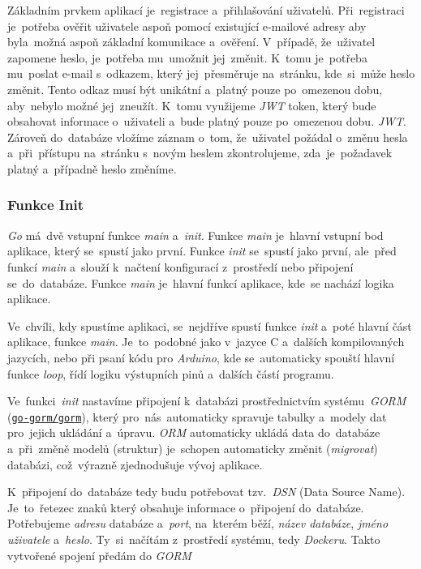 \documentclass[10pt,a4paper]{article}
\begin{document}
            Základním prvkem aplikací je~registrace a~přihlašování uživatelů. Při~registraci je~potřeba ověřit uživatele aspoň pomocí existující e-mailové adresy aby byla~možná aspoň základní komunikace a~ověření. V~případě, že~uživatel zapomene heslo, je~potřeba mu~umožnit jej~změnit. K~tomu je~potřeba mu~poslat e-mail s~odkazem, který jej~přesměruje na~stránku, kde~si~může heslo změnit. Tento odkaz musí být unikátní a~platný pouze po~omezenou dobu, aby~nebylo možné jej~zneužít. K~tomu využijeme \emph{JWT} token, který bude obsahovat informace o~uživateli a~bude platný pouze po~omezenou dobu. \emph{JWT}. Zároveň do~databáze vložíme záznam o~tom, že~uživatel požádal o~změnu hesla a~při~přístupu na~stránku s~novým heslem zkontrolujeme, zda~je~požadavek platný a~případně heslo změníme.
            
            \subsubsection{Funkce Init}
            \emph{Go} má~dvě vstupní funkce \emph{main} a~\emph{init}. Funkce \emph{main} je~hlavní vstupní bod aplikace, který se~spustí jako první. Funkce \emph{init} se~spustí jako první, ale~před funkcí \emph{main} a~slouží k~načtení konfigurací z~prostředí nebo připojení se~do~databáze. Funkce \emph{main} je~hlavní funkcí aplikace, kde~se nachází logika aplikace.

            Ve~chvíli, kdy spustíme aplikaci, se~nejdříve spustí funkce \emph{init} a~poté hlavní část aplikace, funkce \emph{main}. Je~to~podobné jako v~jazyce C a~dalších kompilovaných jazycích, nebo při psaní kódu pro \emph{Arduino}, kde se~automaticky spouští hlavní funkce \emph{loop}, řídí logiku výstupních pinů a~dalších částí programu.
            
            Ve~funkci~\emph{init} nastavíme připojení k~databázi prostřednictvím systému~\emph{GORM} (\href{https://gorm.io/}{\texttt{go-gorm/gorm}}), který pro~nás~automaticky spravuje tabulky a~modely dat pro~jejich ukládání a~úpravu. \emph{ORM} automaticky ukládá data do~databáze a~při~změně modelů (struktur) je~schopen automaticky změnit (\emph{migrovat}) databázi, což~výrazně zjednodušuje vývoj aplikace.

            K~připojení do~databáze tedy budu potřebovat tzv.~\emph{DSN} (Data Source Name). Je~to~řetezec znaků který obsahuje informace o~připojení do~databáze. Potřebujeme \emph{adresu} databáze a~\emph{port}, na~kterém běží, \emph{název databáze}, \emph{jméno uživatele} a~\emph{heslo}. Ty~si~načítám z~prostředí systému, tedy \emph{Dockeru}. Takto vytvořené spojení předám do \emph{GORM}
\end{document}
